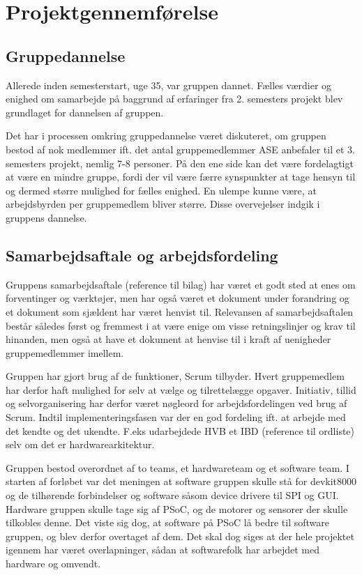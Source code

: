 ﻿\chapter{Projektgennemførelse}
\section{Gruppedannelse}
Allerede inden semesterstart, uge 35, var gruppen dannet. Fælles værdier og enighed om samarbejde på baggrund af erfaringer fra 2. semesters projekt
blev grundlaget for dannelsen af gruppen.

Det har i processen omkring gruppedannelse været diskuteret, om gruppen bestod af nok medlemmer ift. det antal gruppemedlemmer ASE anbefaler til et 3. semesters
projekt, nemlig 7-8 personer. På den ene side kan det være fordelagtigt at være en mindre gruppe, fordi der vil være færre synspunkter at tage hensyn til
og dermed større mulighed for fælles enighed. En ulempe kunne være, at arbejdsbyrden per gruppemedlem bliver større. Disse overvejelser indgik i gruppens dannelse.\\

\section{Samarbejdsaftale og arbejdsfordeling}
Gruppens samarbejdsaftale (reference til bilag) har været et godt sted at enes om forventinger og værktøjer, men har også været et dokument under forandring
og et dokument som sjældent har været henvist til. 
Relevansen af samarbejdsaftalen består således først og fremmest i at være enige om visse retningslinjer og krav til hinanden, men også at have et dokument
at henvise til i kraft af uenigheder gruppemedlemmer imellem.

Gruppen har gjort brug af de funktioner, Scrum tilbyder. Hvert gruppemedlem har derfor haft mulighed for selv at vælge og tilrettelægge opgaver. Initiativ,
tillid og selvorganisering har derfor været nøgleord for arbejdsfordelingen ved brug af Scrum.
Indtil implementeringsfasen var der en god fordeling ift. at arbejde med det kendte og det ukendte. F.eks udarbejdede HVB et IBD (reference til ordliste)
selv om det er hardwarearkitektur.

Gruppen bestod overordnet af to teams, et hardwareteam og et software team. I starten af forløbet var det meningen at software gruppen skulle stå for devkit8000
og de tilhørende forbindelser og software såsom device drivere til SPI og GUI. 
Hardware gruppen skulle tage sig af PSoC, og de motorer og sensorer der skulle tilkobles denne. Det viste sig dog, at software på PSoC lå bedre til software gruppen,
og blev derfor overtaget af dem. Det skal dog siges at der hele projektet igennem har været overlapninger, sådan at softwarefolk har arbejdet med hardware og omvendt.

